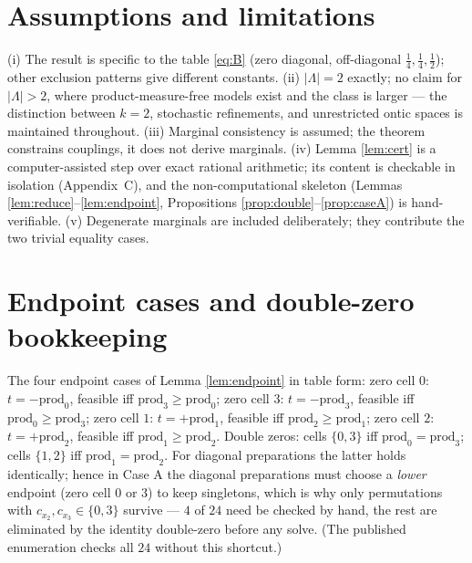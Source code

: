 \documentclass[11pt,a4paper]{article}
\begin{document}
\section{Assumptions and limitations}
\label{sec:limits}
(i) The result is specific to the table \eqref{eq:B} (zero diagonal, off-diagonal $\tfrac14,\tfrac14,\tfrac12$); other exclusion patterns give different constants. (ii) $|\Lambda|=2$ exactly; no claim for $|\Lambda|>2$, where product-measure-free models exist and the class is larger --- the distinction between $k=2$, stochastic refinements, and unrestricted ontic spaces is maintained throughout. (iii) Marginal consistency is assumed; the theorem constrains couplings, it does not derive marginals. (iv) Lemma \ref{lem:cert} is a computer-assisted step over exact rational arithmetic; its content is checkable in isolation (Appendix~C), and the non-computational skeleton (Lemmas \ref{lem:reduce}--\ref{lem:endpoint}, Propositions \ref{prop:double}--\ref{prop:caseA}) is hand-verifiable. (v) Degenerate marginals are included deliberately; they contribute the two trivial equality cases.

\appendix
\section{Endpoint cases and double-zero bookkeeping}
The four endpoint cases of Lemma \ref{lem:endpoint} in table form: zero cell $0$: $t=-\mathrm{prod}_0$, feasible iff $\mathrm{prod}_3\ge\mathrm{prod}_0$; zero cell $3$: $t=-\mathrm{prod}_3$, feasible iff $\mathrm{prod}_0\ge\mathrm{prod}_3$; zero cell $1$: $t=+\mathrm{prod}_1$, feasible iff $\mathrm{prod}_2\ge\mathrm{prod}_1$; zero cell $2$: $t=+\mathrm{prod}_2$, feasible iff $\mathrm{prod}_1\ge\mathrm{prod}_2$. Double zeros: cells $\{0,3\}$ iff $\mathrm{prod}_0=\mathrm{prod}_3$; cells $\{1,2\}$ iff $\mathrm{prod}_1=\mathrm{prod}_2$. For diagonal preparations the latter holds identically; hence in Case A the diagonal preparations must choose a \emph{lower} endpoint (zero cell $0$ or $3$) to keep singletons, which is why only permutations with $c_{x_2},c_{x_3}\in\{0,3\}$ survive --- $4$ of $24$ need be checked by hand, the rest are eliminated by the identity double-zero before any solve. (The published enumeration checks all $24$ without this shortcut.)
\end{document}
